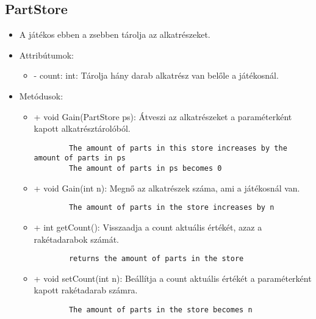 \subsection{PartStore}
\begin{itemize}
	\item A játékos ebben a zsebben tárolja az alkatrészeket.
	\item Attribútumok:
	\begin{itemize}
		\item - count: int: Tárolja hány darab alkatrész van belőle a játékosnál.
	\end{itemize}
	\item Metódusok:
	\begin{itemize}
		\item + void Gain(PartStore ps): Átveszi az alkatrészeket a paraméterként kapott alkatrésztárolóból.
		\begin{lstlisting}
		The amount of parts in this store increases by the amount of parts in ps
		The amount of parts in ps becomes 0
		\end{lstlisting}
		\item + void Gain(int n): Megnő az alkatrészek száma, ami a játékosnál van.
		\begin{lstlisting}
		The amount of parts in the store increases by n
		\end{lstlisting}
		\item + int getCount(): Visszaadja a count aktuális értékét, azaz a rakétadarabok számát.
		\begin{lstlisting}
		returns the amount of parts in the store
		\end{lstlisting}
		\item + void setCount(int n): Beállítja a count aktuális értékét a paraméterként kapott rakétadarab számra.
		\begin{lstlisting}
		The amount of parts in the store becomes n
		\end{lstlisting}
	\end{itemize}
\end{itemize}

